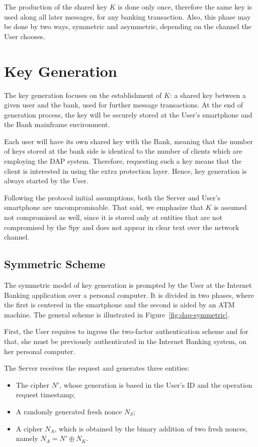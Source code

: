 The production of the shared key \(K\) is done only once, therefore the same key is used along all later messages, for any banking transaction. Also, this phase may be done by two ways, symmetric and asymmetric, depending on the channel the User chooses.





\section{Key Generation}
The key generation focuses on the establishment of \(K\): a shared key between a given user and the bank, used for further message transactions. At the end of generation process, the key will be securely stored at the User's smartphone and the Bank mainframe environment.

Each user will have its own shared key with the Bank, meaning that the number of keys stored at the bank side is identical to the number of clients which are employing the DAP system. Therefore, requesting such a key means that the client is interested in using the extra protection layer. Hence, key generation is always started by the User.

Following the protocol initial assumptions, both the Server and User's smartphone are uncompromisable. That said, we emphasize that \(K\) is assumed not compromised as well, since it is stored only at entities that are not compromised by the Spy and does not appear in clear text over the network channel.



\subsection{Symmetric Scheme}
The symmetric model of key generation is prompted by the User at the Internet Banking application over a personal computer. It is divided in two phases, where the first is centered in the smartphone and the second is aided by an ATM machine. The general scheme is illustrated in Figure~\ref{fig:dap-symmetric}.

First, the User requires to ingress the two-factor authentication scheme and for that, she must be previously authenticated in the Internet Banking system, on her personal computer.

The Server receives the request and generates three entities:
\begin{itemize}
  \item The cipher \(N'\), whose generation is based in the User's ID and the operation request timestamp;

  \item A randomly generated fresh nonce \(N_S\);

  \item A cipher \(N_A\), which is obtained by the binary addition of two fresh nonces, namely \(N_A = N' \oplus N_K\).
\end{itemize}

